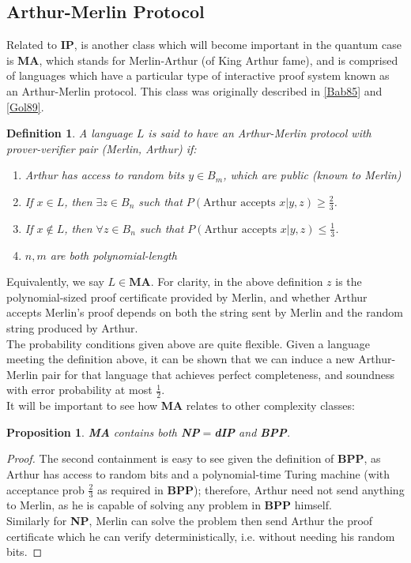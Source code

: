 \documentclass[12pt]{article}
\newtheorem{defn}{Definition}
\newtheorem{prop}{Proposition}
\numberwithin{thm}{section}
\numberwithin{defn}{section}
\numberwithin{prop}{section}
\numberwithin{rmk}{section}
\begin{document}
	\subsection{Arthur-Merlin Protocol}
	Related to \textbf{IP}, is another class which will become important in the quantum case is \textbf{MA}, which stands for Merlin-Arthur (of King Arthur fame), and is comprised of languages which have a particular type of interactive proof system known as an Arthur-Merlin protocol. This class was originally described in \hyperref[bab]{[Bab85]} and \hyperref[gol89]{[Gol89]}.
	
	\begin{defn}
		A language $L$ is said to have an Arthur-Merlin protocol with prover-verifier pair (Merlin, Arthur) if:
		\begin{enumerate}
			\item Arthur has access to random bits $y\in B_m$, which are public (known to Merlin)
			\item If $x\in L$, then $\exists z\in B_n$ such that $P(\text{Arthur accepts }x|y,z)\geq \frac{2}{3}$.
			\item If $x\notin L$, then $\forall z\in B_n$ such that $P(\text{Arthur accepts }x|y,z)\leq\frac{1}{3}$. 
			\item $n,m$ are both polynomial-length
		\end{enumerate}
	
	
	\end{defn}
	Equivalently, we say $L\in \textbf{MA}$. For clarity, in the above definition $z$ is the polynomial-sized proof certificate provided by Merlin, and whether Arthur accepts Merlin's proof depends on both the string sent by Merlin and the random string produced by Arthur.\\
	
	The probability conditions given above are quite flexible. Given a language meeting the definition above, it can be shown that we can induce a new Arthur-Merlin pair for that language that achieves perfect completeness, and soundness with error probability at most $\frac{1}{2}$.\\
	
	It will be important to see how \textbf{MA} relates to other complexity classes:
	\begin{prop}\textbf{MA} contains both \textbf{NP}$=$\textbf{dIP} and \textbf{BPP}. \end{prop}
	\begin{proof}The second containment is easy to see given the definition of \textbf{BPP}, as Arthur has access to random bits and a polynomial-time Turing machine (with acceptance prob $\frac{2}{3}$ as required in \textbf{BPP}); therefore, Arthur need not send anything to Merlin, as he is capable of solving any problem in \textbf{BPP} himself.\\Similarly for \textbf{NP}, Merlin can solve the problem then send Arthur the proof certificate which he can verify deterministically, i.e. without needing his random bits. \end{proof}
	
\end{document}
